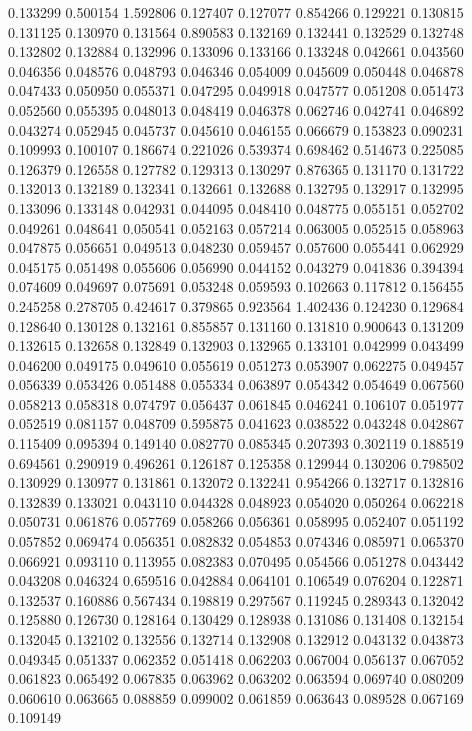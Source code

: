 0.133299
0.500154
1.592806
0.127407
0.127077
0.854266
0.129221
0.130815
0.131125
0.130970
0.131564
0.890583
0.132169
0.132441
0.132529
0.132748
0.132802
0.132884
0.132996
0.133096
0.133166
0.133248
0.042661
0.043560
0.046356
0.048576
0.048793
0.046346
0.054009
0.045609
0.050448
0.046878
0.047433
0.050950
0.055371
0.047295
0.049918
0.047577
0.051208
0.051473
0.052560
0.055395
0.048013
0.048419
0.046378
0.062746
0.042741
0.046892
0.043274
0.052945
0.045737
0.045610
0.046155
0.066679
0.153823
0.090231
0.109993
0.100107
0.186674
0.221026
0.539374
0.698462
0.514673
0.225085
0.126379
0.126558
0.127782
0.129313
0.130297
0.876365
0.131170
0.131722
0.132013
0.132189
0.132341
0.132661
0.132688
0.132795
0.132917
0.132995
0.133096
0.133148
0.042931
0.044095
0.048410
0.048775
0.055151
0.052702
0.049261
0.048641
0.050541
0.052163
0.057214
0.063005
0.052515
0.058963
0.047875
0.056651
0.049513
0.048230
0.059457
0.057600
0.055441
0.062929
0.045175
0.051498
0.055606
0.056990
0.044152
0.043279
0.041836
0.394394
0.074609
0.049697
0.075691
0.053248
0.059593
0.102663
0.117812
0.156455
0.245258
0.278705
0.424617
0.379865
0.923564
1.402436
0.124230
0.129684
0.128640
0.130128
0.132161
0.855857
0.131160
0.131810
0.900643
0.131209
0.132615
0.132658
0.132849
0.132903
0.132965
0.133101
0.042999
0.043499
0.046200
0.049175
0.049610
0.055619
0.051273
0.053907
0.062275
0.049457
0.056339
0.053426
0.051488
0.055334
0.063897
0.054342
0.054649
0.067560
0.058213
0.058318
0.074797
0.056437
0.061845
0.046241
0.106107
0.051977
0.052519
0.081157
0.048709
0.595875
0.041623
0.038522
0.043248
0.042867
0.115409
0.095394
0.149140
0.082770
0.085345
0.207393
0.302119
0.188519
0.694561
0.290919
0.496261
0.126187
0.125358
0.129944
0.130206
0.798502
0.130929
0.130977
0.131861
0.132072
0.132241
0.954266
0.132717
0.132816
0.132839
0.133021
0.043110
0.044328
0.048923
0.054020
0.050264
0.062218
0.050731
0.061876
0.057769
0.058266
0.056361
0.058995
0.052407
0.051192
0.057852
0.069474
0.056351
0.082832
0.054853
0.074346
0.085971
0.065370
0.066921
0.093110
0.113955
0.082383
0.070495
0.054566
0.051278
0.043442
0.043208
0.046324
0.659516
0.042884
0.064101
0.106549
0.076204
0.122871
0.132537
0.160886
0.567434
0.198819
0.297567
0.119245
0.289343
0.132042
0.125880
0.126730
0.128164
0.130429
0.128938
0.131086
0.131408
0.132154
0.132045
0.132102
0.132556
0.132714
0.132908
0.132912
0.043132
0.043873
0.049345
0.051337
0.062352
0.051418
0.062203
0.067004
0.056137
0.067052
0.061823
0.065492
0.067835
0.063962
0.063202
0.063594
0.069740
0.080209
0.060610
0.063665
0.088859
0.099002
0.061859
0.063643
0.089528
0.067169
0.109149
